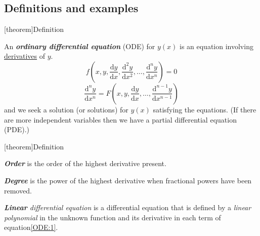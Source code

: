 \documentclass[12pt]{report}
\theoremstyle{definition}
\begin{document}
\subsection{Definitions and examples}

[theorem]{Definition}
\begin{ODE}
    An \textbf{\emph{ordinary differential equation}} (ODE) for $y (x)$
    is an equation involving \underline{derivatives} of $y$.
    \begin{equation}\label{ODE:1}
        f(x, y, \frac{\mathrm{d} y}{\mathrm{d}x}, \frac{\mathrm{d}^{2} y}{\mathrm{d}x^{2}}, \ldots,
        \frac{\mathrm{d}^{n} y}{\mathrm{d}x^{n}}) = 0
        \end{equation}
    \[
        \frac{\mathrm{d}^{n} y}{\mathrm{d}x^{n}} = 
        F(x, y, \frac{\mathrm{d} y}{\mathrm{d}x}, \ldots, \frac{\mathrm{d}^{n-1} y}{\mathrm{d}x^{n-1}})
    \]
    and we seek a solution (or solutions) for $y(x)$ satisfying the equations.
    (If there are more independent variables then we have a partial differential equation (PDE).)
\end{ODE}

[theorem]{Definition}
\begin{order and power}
    \;

    \textbf{\emph{Order}} is the order of the highest derivative present.

    \textbf{\emph{Degree}} is the power of the highest derivative when fractional powers have been removed.

    \emph{\textbf{Linear} differential equation} is a differential equation that is defined by a \emph{linear polynomial}
    in the unknown function and its derivative in each term of equation\eqref{ODE:1}.
\end{order and power}
\end{document}
